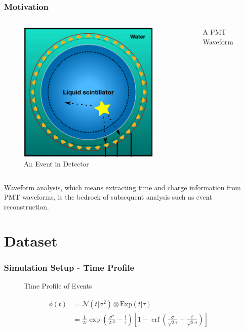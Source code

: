 \documentclass{beamer}
\DeclareMathOperator{\erf}{erf}
\begin{document}
\begin{CJK*}{UTF8}{gbsn}
\begin{frame}
\frametitle{Motivation}
\begin{columns}
\begin{figure}
    \centering
    \includegraphics[width=1.0\linewidth]{img/event.png}
    \caption{An Event in Detector}
\end{figure}
\begin{figure}
    \centering
    \resizebox{\textwidth}{!}{}
    \caption{A PMT Waveform}
\end{figure}
\end{columns}
\begin{block}{}
Waveform analysis, which means extracting time and charge information from PMT waveforms, is the bedrock of subsequent analysis such as event reconstruction. 
\end{block}
\end{frame}

\section{Dataset}

\begin{frame}
\frametitle{Simulation Setup - Time Profile}
\begin{figure}
    \centering
    \resizebox{0.4\textwidth}{!}{}
    \caption{Time Profile of Events}
\end{figure}
\begin{align*}
    \phi(t) &= \mathcal{N}(t|\sigma^2)\otimes \mathrm{Exp}(t|\tau) \\
    &= \frac{1}{2\tau} \exp\left(\frac{\sigma^2}{2\tau^2}-\frac{t}{\tau}\right) \left[1 - \erf\left( \frac{\sigma}{\sqrt{2}\tau} - \frac{t}{\sqrt{2}\sigma} \right)\right]
\end{align*}
\end{frame}


\end{CJK*}
\end{document}
